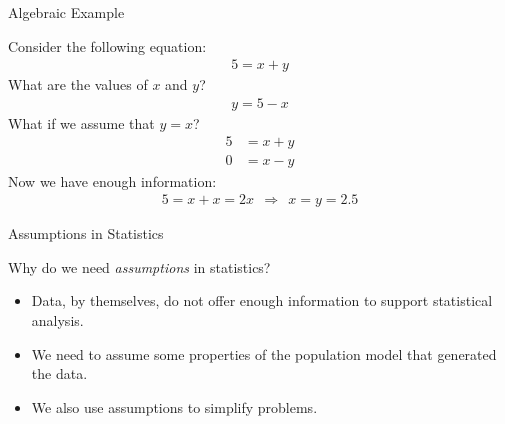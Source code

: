 \documentclass{beamer}\usepackage[]{graphicx}\usepackage[]{color}
\begin{document}

\begin{frame}{Algebraic Example}
  
  Consider the following equation:
  \begin{align*}
    5 = x + y
  \end{align*}
  What are the values of $x$ and $y$?
  \pause
  \begin{align*}
    y = 5 - x
  \end{align*}
  \pause
  What if we assume that $y = x$?
  \pause
  \begin{align*}
    5 &= x + y\\
    0 &= x - y
  \end{align*}
  \pause
  Now we have enough information:
  \begin{align*}
    5 = x + x = 2x~~\Rightarrow~~x = y = 2.5
  \end{align*}
  
\end{frame}


\begin{frame}{Assumptions in Statistics}
  
  Why do we need \emph{assumptions} in statistics?
  \begin{itemize}
  \item Data, by themselves, do not offer enough information to support 
    statistical analysis.
    \vc
  \item We need to assume some properties of the population model that generated
    the data.
    \vc
  \item We also use assumptions to simplify problems.
  \end{itemize}
  
\end{frame}

\end{document}
